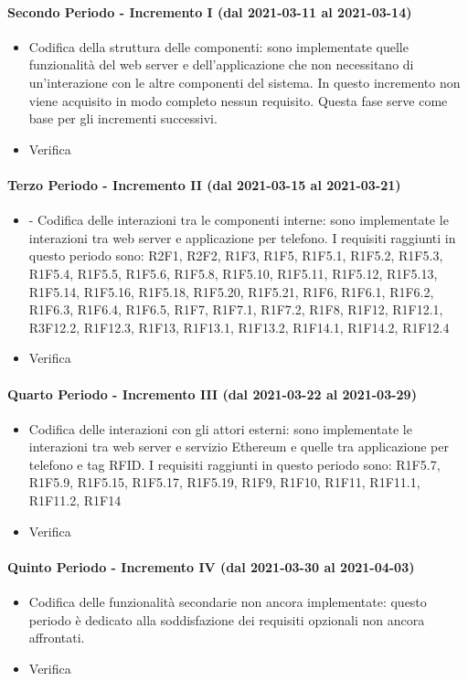\paragraph{Secondo Periodo - Incremento I (dal 2021-03-11 al 2021-03-14)}
\begin{itemize}
	\item Codifica della struttura delle componenti: sono implementate quelle funzionalità del web server e dell'applicazione che non necessitano di un'interazione con le altre componenti del sistema. In questo incremento non viene acquisito in modo completo nessun requisito. Questa fase serve come base per gli incrementi successivi.
	\item Verifica
\end{itemize}

\paragraph{Terzo Periodo - Incremento II (dal 2021-03-15 al 2021-03-21)}
\begin{itemize}
	\item  - Codifica delle interazioni tra le componenti interne: sono implementate le interazioni tra web server e applicazione per telefono. I requisiti raggiunti in questo periodo sono: R2F1, R2F2, R1F3, R1F5, R1F5.1, R1F5.2, R1F5.3, R1F5.4, R1F5.5, R1F5.6, R1F5.8, R1F5.10, R1F5.11, R1F5.12, R1F5.13, R1F5.14, R1F5.16, R1F5.18, R1F5.20, R1F5.21, R1F6, R1F6.1, R1F6.2, R1F6.3, R1F6.4, R1F6.5, R1F7, R1F7.1, R1F7.2, R1F8, R1F12, R1F12.1, R3F12.2, R1F12.3, R1F13, R1F13.1, R1F13.2, R1F14.1, R1F14.2, R1F12.4
	\item Verifica
\end{itemize}

\paragraph{Quarto Periodo - Incremento III (dal 2021-03-22 al 2021-03-29)}
\begin{itemize}
	\item Codifica delle interazioni con gli attori esterni: sono implementate le interazioni tra web server e servizio Ethereum e quelle tra applicazione per telefono e tag RFID.
	I requisiti raggiunti in questo periodo sono: R1F5.7, R1F5.9, R1F5.15, R1F5.17, R1F5.19, R1F9, R1F10, R1F11, R1F11.1, R1F11.2, R1F14
	\item Verifica
\end{itemize}

\paragraph{Quinto Periodo - Incremento IV (dal 2021-03-30 al 2021-04-03)}
\begin{itemize}
	\item Codifica delle funzionalità secondarie non ancora implementate: questo periodo è dedicato alla soddisfazione dei requisiti opzionali non ancora affrontati.
	\item Verifica
\end{itemize}

